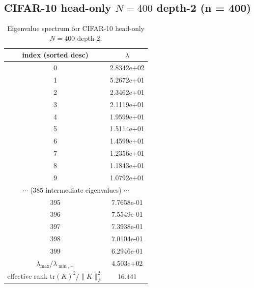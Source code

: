 \subsection*{CIFAR-10 head-only $N = 400$ depth-2 \quad (n = 400)}
\begin{table}[H]
\centering
\caption{Eigenvalue spectrum for CIFAR-10 head-only $N = 400$ depth-2.}
\begin{tabular}{c c}
\toprule
index (sorted desc) & $\lambda$ \\
\midrule
0 & 2.8342e+02 \\
1 & 5.2672e+01 \\
2 & 2.3462e+01 \\
3 & 2.1119e+01 \\
4 & 1.9599e+01 \\
5 & 1.5114e+01 \\
6 & 1.4599e+01 \\
7 & 1.2356e+01 \\
8 & 1.1843e+01 \\
9 & 1.0792e+01 \\
\multicolumn{2}{c}{$\cdots$ (385 intermediate eigenvalues) $\cdots$} \\
395 & 7.7658e-01 \\
396 & 7.5549e-01 \\
397 & 7.3938e-01 \\
398 & 7.0104e-01 \\
399 & 6.2946e-01 \\
\midrule
$\lambda_{\max}/\lambda_{\min, +}$ & 4.503e+02 \\
effective rank $\mathrm{tr}(K)^2/\|K\|_F^2$ & 16.441 \\
\bottomrule
\end{tabular}
\end{table}

